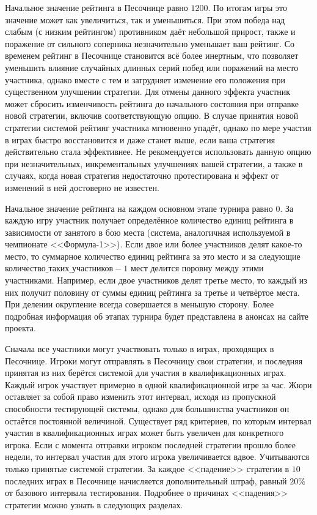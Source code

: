 Начальное значение рейтинга в Песочнице равно $1200$. По итогам игры это значение может как увеличиться, так и уменьшиться. При этом победа
над слабым (с низким рейтингом) противником даёт небольшой прирост, также и поражение от сильного соперника незначительно уменьшает ваш
рейтинг. Со временем рейтинг в Песочнице становится всё более инертным, что позволяет уменьшить влияние случайных длинных серий побед или
поражений на место участника, однако вместе с тем и затрудняет изменение его положения при существенном улучшении стратегии. Для отмены
данного эффекта участник может сбросить изменчивость рейтинга до начального состояния при отправке новой стратегии, включив соответствующую
опцию. В случае принятия новой стратегии системой рейтинг участника мгновенно упадёт, однако по мере участия в играх быстро восстановится и
даже станет выше, если ваша стратегия действительно стала эффективнее. Не рекомендуется использовать данную опцию при незначительных,
инкрементальных улучшениях вашей стратегии, а также в случаях, когда новая стратегия недостаточно протестирована и эффект от изменений в
ней достоверно не известен.

Начальное значение рейтинга на каждом основном этапе турнира равно $0$. За каждую игру участник получает определённое количество единиц
рейтинга в зависимости от занятого в бою места (система, аналогичная используемой в чемпионате <<Формула-1>>). Если двое или более
участников делят какое-то место, то суммарное количество единиц рейтинга за это место и за следующие
$\texttt{количество\_таких\_участников}-1$ мест делится поровну между этими участниками. Например, если двое участников делят третье место,
то каждый из них получит половину от суммы единиц рейтинга за третье и четвёртое места. При делении округление всегда совершается в меньшую
сторону. Более подробная информация об этапах турнира будет представлена в анонсах на сайте проекта.

Сначала все участники могут участвовать только в играх, проходящих в Песочнице. Игроки могут отправлять в Песочницу свои стратегии, и
последняя принятая из них берётся системой для участия в квалификационных играх. Каждый игрок участвует примерно в одной квалификационной
игре за час. Жюри оставляет за собой право изменить этот интервал, исходя из пропускной способности тестирующей системы, однако для
большинства участников он остаётся постоянной величиной. Существует ряд критериев, по которым интервал участия в квалификационных играх
может быть увеличен для конкретного игрока. Если с момента отправки игроком последней стратегии прошло более недели, то интервал участия
для этого игрока увеличивается вдвое. Учитываются только принятые системой стратегии. За каждое <<падение>> стратегии в $10$ последних
играх в Песочнице начисляется дополнительный штраф, равный $20\%$ от базового интервала тестирования. Подробнее о причинах <<падения>>
стратегии можно узнать в следующих разделах.

